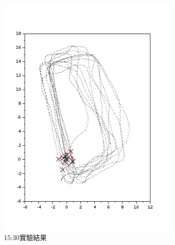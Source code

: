 \begin{figure}[h!]
\begin{subfigure}[t]{0.32\textwidth}
		\includegraphics[width=\textwidth]{figures/appendix1/dynamic_8}
		\caption{15:30實驗結果}
		\label{f:app:dynamic_8}
	\end{subfigure}
	\begin{subfigure}[t]{0.32\textwidth}

\end{subfigure}
\end{figure}
